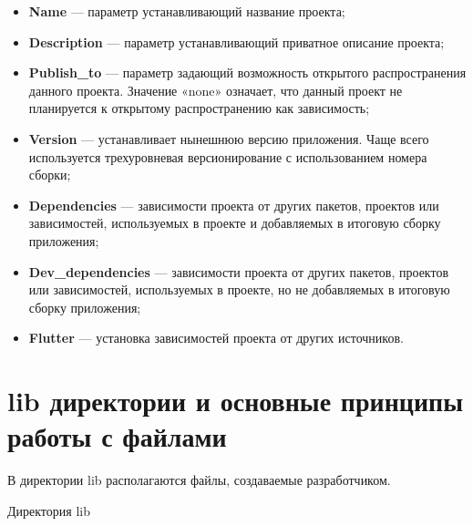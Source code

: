 \begin{itemize}
	\item \textbf{Name} --- параметр устанавливающий название проекта;
	\item \textbf{Description} --- параметр устанавливающий
		приватное описание проекта;
	\item \textbf{Publish\_to} --- параметр задающий возможность открытого
		распространения данного проекта. Значение «none» означает,
		что данный проект не планируется к открытому распространению
		как зависимость;
	\item \textbf{Version} --- устанавливает нынешнюю версию приложения.
		Чаще всего используется трехуровневая версионирование
		с использованием номера сборки;
	\item \textbf{Dependencies} --- зависимости проекта от других пакетов,
		проектов или зависимостей, используемых в проекте
		и добавляемых в итоговую сборку приложения;
	\item \textbf{Dev\_dependencies} --- зависимости проекта от других пакетов,
		проектов или зависимостей, используемых в проекте,
		но не добавляемых в итоговую сборку приложения;
	\item \textbf{Flutter} --- установка зависимостей проекта
		от других источников.
\end{itemize}

\section{lib директории и основные принципы работы с файлами}

В директории lib  располагаются файлы, создаваемые разработчиком.

\begin{image}
	\caption{Директория lib}
	\label{fig:lib}
\end{image}

